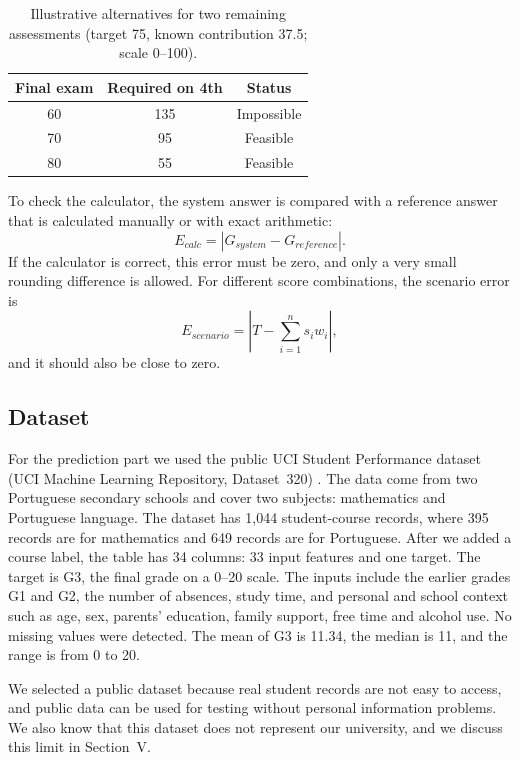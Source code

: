 \documentclass[10pt,twocolumn,a4paper]{article}
\newcommand{\Gthree}{G3}
\newcommand{\Gtwo}{G2}
\newcommand{\Gone}{G1}
\begin{document}
\begin{table}[t]
\centering
\caption{Illustrative alternatives for two remaining assessments (target 75, known contribution 37.5; scale 0--100).}
\label{tab:alt}
\small
\begin{tabular}{ccc}
\toprule
\textbf{Final exam} & \textbf{Required on 4th} & \textbf{Status}\\
\midrule
60 & 135 & Impossible\\
70 & 95 & Feasible\\
80 & 55 & Feasible\\
\bottomrule
\end{tabular}
\end{table}

To check the calculator, the system answer is compared with a reference answer that is calculated manually or with exact arithmetic:
\begin{equation}
E_{calc}=\left|G_{system}-G_{reference}\right| .
\end{equation}
If the calculator is correct, this error must be zero, and only a very small rounding difference is allowed. For different score combinations, the scenario error is
\begin{equation}
E_{scenario}=\left|T-\sum_{i=1}^{n}s_i w_i\right| ,
\end{equation}
and it should also be close to zero.

\subsection{Dataset}
For the prediction part we used the public UCI Student Performance dataset (UCI Machine Learning Repository, Dataset~320) \cite{cortez2008}. The data come from two Portuguese secondary schools and cover two subjects: mathematics and Portuguese language. The dataset has 1,044 student-course records, where 395 records are for mathematics and 649 records are for Portuguese. After we added a course label, the table has 34 columns: 33 input features and one target. The target is \Gthree, the final grade on a 0--20 scale. The inputs include the earlier grades \Gone{} and \Gtwo, the number of absences, study time, and personal and school context such as age, sex, parents' education, family support, free time and alcohol use. No missing values were detected. The mean of \Gthree{} is 11.34, the median is 11, and the range is from 0 to 20.

We selected a public dataset because real student records are not easy to access, and public data can be used for testing without personal information problems. We also know that this dataset does not represent our university, and we discuss this limit in Section~V.
\end{document}
